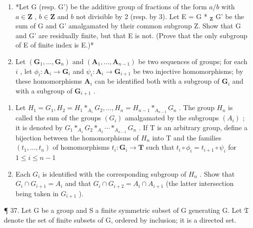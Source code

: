 \begin{enumerate}
\def\labelenumi{\arabic{enumi}.}
\setcounter{enumi}{34}
\item
  *Let G (resp. G') be the additive group of fractions of the form \(a/b\) with \(a \in \mathbf{Z}\) , \(b \in \mathbf{Z}\) and \(b\) not divisible by 2 (resp. by 3). Let E = G * \(_{\mathbf{Z}}\) G' be the sum of G and G' amalgamated by their common subgroup Z. Show that G and G' are residually finite, but that E is not. (Prove that the only subgroup of E of finite index is E.)*
\item
  Let \((\mathbf{G}_1, \ldots, \mathbf{G}_n)\) and \((\mathbf{A}_1, \ldots, \mathbf{A}_{n-1})\) be two sequences of groups; for each \(i\) , let \(\phi_i: \mathbf{A}_i \to \mathbf{G}_i\) and \(\psi_i: \mathbf{A}_i \to \mathbf{G}_{i+1}\) be two injective homomorphisms; by these homomorphisms \(\mathbf{A}_i\) can be identified both with a subgroup of \(\mathbf{G}_i\) and with a subgroup of \(\mathbf{G}_{i+1}\) .
\end{enumerate}

\begin{enumerate}
\def\labelenumi{(\alph{enumi})}
\item
  Let \(H_{1}=G_{1}, H_{2}=H_{1} *_{A_{1}} G_{2}, \ldots, H_{n}=H_{n-1} *_{A_{n-1}} G_{n}\) . The group \(H_{n}\) is called the sum of the groups \((G_{i})\) amalgamated by the subgroups \((A_{i})\) ; it is denoted by \(G_{1} *_{A_{1}} G_{2} *_{A_{2}} \cdots *_{A_{n-1}} G_{n}\) . If T is an arbitrary group, define a bijection between the homomorphisms of \(H_{n}\) into T and the families \((t_{1},\ldots ,t_{n})\) of homomorphisms \(t_i\colon \mathbf{G}_i\to \mathbf{T}\) such that \(t_i\circ \phi_i = t_{i + 1}\circ \psi_i\) for \(1\leqslant i\leqslant n - 1\)
\item
  Each \(G_{i}\) is identified with the corresponding subgroup of \(H_{n}\) . Show that \(G_{i} \cap G_{i+1} = A_{i}\) and that \(G_{i} \cap G_{i+2} = A_{i} \cap A_{i+1}\) (the latter intersection being taken in \(G_{i+1}\) ).
\end{enumerate}

¶ 37. Let G be a group and S a finite symmetric subset of G generating G. Let \(\mathfrak{T}\) denote the set of finite subsets of G, ordered by inclusion; it is a directed set.

